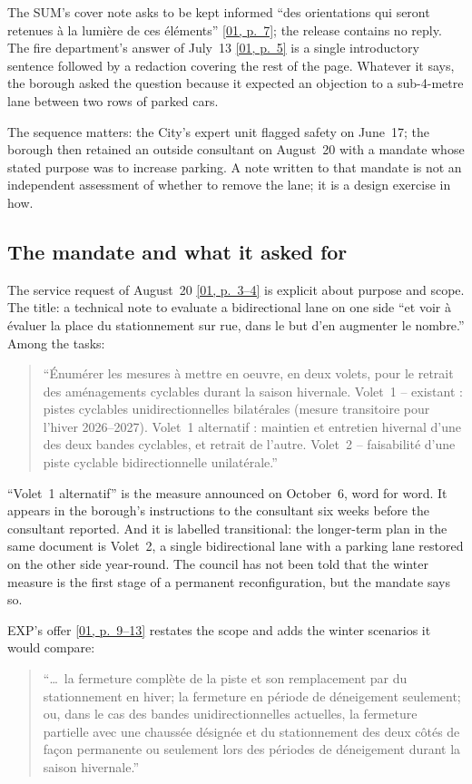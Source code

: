 \documentclass[11pt,letterpaper]{article}
\newcommand{\pagesurl}{https://openmobilitydata.github.io/Terrebonne-access-requests}
\newcommand{\pgl}[3]{\href{\pagesurl/\csname bundle#1\endcsname\#page=#2}{\textsf{\small[#1, p.~#3]}}}
\newcommand{\pg}[2]{\pgl{#1}{#2}{#2}}
\newcommand{\quot}[1]{\begin{quote}\small #1\end{quote}}
\begin{document}
The SUM's cover note asks to be kept informed ``des orientations qui seront
retenues \`a la lumi\`ere de ces \'el\'ements'' \pg{01}{7}; the release contains
no reply. The fire department's answer of July~13 \pg{01}{5} is a single
introductory sentence followed by a redaction covering the rest of the page.
Whatever it says, the borough asked the question because it expected an
objection to a sub-4-metre lane between two rows of parked cars.

The sequence matters: the City's expert unit flagged safety on June~17; the
borough then retained an outside consultant on August~20 with a mandate
whose stated purpose was to increase parking. A note written to that mandate
is not an independent assessment of whether to remove the lane; it is a
design exercise in how.

\subsection{The mandate and what it asked for}

The service request of August~20 \pgl{01}{3}{3--4} is explicit about purpose and
scope. The title: a technical note to evaluate a bidirectional lane on one
side ``et voir \`a \'evaluer la place du stationnement sur rue, dans le but
d'en augmenter le nombre.'' Among the tasks:

\quot{``\'Enum\'erer les mesures \`a mettre en oeuvre, en deux volets, pour le
retrait des am\'enagements cyclables durant la saison hivernale.
Volet~1 -- existant : pistes cyclables unidirectionnelles bilat\'erales
(mesure transitoire pour l'hiver 2026--2027). Volet~1 alternatif : maintien
et entretien hivernal d'une des deux bandes cyclables, et retrait de
l'autre. Volet~2 -- faisabilit\'e d'une piste cyclable bidirectionnelle
unilat\'erale.''}

``Volet~1 alternatif'' is the measure announced on October~6, word for
word. It appears in the borough's instructions to the consultant six weeks
before the consultant reported. And it is labelled transitional: the
longer-term plan in the same document is Volet~2, a single bidirectional
lane with a parking lane restored on the other side year-round. The
council has not been told that the winter measure is the first stage of a
permanent reconfiguration, but the mandate says so.

EXP's offer \pgl{01}{9}{9--13} restates the scope and adds the winter scenarios
it would compare:

\quot{``\ldots\ la fermeture compl\`ete de la piste et son remplacement par du
stationnement en hiver; la fermeture en p\'eriode de d\'eneigement seulement;
ou, dans le cas des bandes unidirectionnelles actuelles, la fermeture
partielle avec une chauss\'ee d\'esign\'ee et du stationnement des deux c\^ot\'es
de fa\c{c}on permanente ou seulement lors des p\'eriodes de d\'eneigement
durant la saison hivernale.''}
\end{document}

